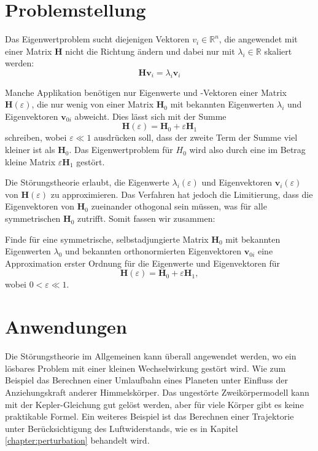%
%
\section{Problemstellung
\label{ew:section:problemstellung}}
Das Eigenwertproblem sucht diejenigen Vektoren $v_i \in \mathbb{R}^{n} $, die angewendet mit einer Matrix $\bm H$ nicht die Richtung ändern und dabei nur mit $\lambda_i \in \mathbb{R}$ skaliert werden:
\begin{equation}
    \bm H \bm v_i = \lambda_i \bm v_i \label{ew:eq:eig}
\end{equation}

Manche Applikation benötigen nur Eigenwerte und -Vektoren einer Matrix $\bm H(\varepsilon)$, die nur wenig von einer Matrix $\bm H_0$ mit bekannten Eigenwerten $\lambda_{i}$ und Eigenvektoren $\bm v_{0i}$ abweicht.
Dies lässt sich mit der Summe
\begin{equation}
    \bm H(\varepsilon) = \bm H_0 + \varepsilon \bm H_1
\end{equation}
schreiben, wobei $\varepsilon \ll 1 $ ausdrücken soll, dass der zweite Term der Summe viel kleiner ist als $\bm H_0$.
Das Eigenwertproblem für $H_0$ wird also durch eine im Betrag kleine Matrix $ \varepsilon \bm H_1$ gestört.

Die Störungstheorie erlaubt, die Eigenwerte $\lambda_i(\varepsilon)$ und Eigenvektoren  $\bm v_i(\varepsilon)$ von $\bm H(\varepsilon)$ zu approximieren.
Das Verfahren hat jedoch die Limitierung, dass die Eigenvektoren von $\bm H_0$ zueinander othogonal sein müssen, was für alle symmetrischen $\bm H_0$ zutrifft.
%
Somit fassen wir zusammen:
\begin{ewproblem*}
Finde für eine symmetrische, selbstadjungierte Matrix $\bm H_0$ mit bekannten Eigenwerten $\lambda_{0}$ und bekannten orthonormierten Eigenvektoren $\bm v_{0i}$ eine Approximation erster Ordnung für die Eigenwerte und Eigenvektoren für
\begin{equation*}
    \bm H(\varepsilon) = \bm H_0 + \varepsilon \bm H_1,
\end{equation*}
wobei $ 0 < \varepsilon \ll 1$.
\end{ewproblem*}
%

\section{Anwendungen}
Die Störungstheorie im Allgemeinen kann überall angewendet werden, wo ein lösbares Problem mit einer kleinen Wechselwirkung gestört wird.
Wie zum Beispiel das Berechnen einer Umlaufbahn eines Planeten unter Einfluss der Anziehungskraft anderer Himmelskörper.
%
%
Das ungestörte Zweikörpermodell kann mit der Kepler-Gleichung gut gelöst werden, aber für viele Körper gibt es keine praktikable Formel.
%
%
Ein weiteres Beispiel ist das Berechnen einer Trajektorie unter Berücksichtigung des Luftwiderstands, wie es in Kapitel \ref{chapter:perturbation} behandelt wird.
%

